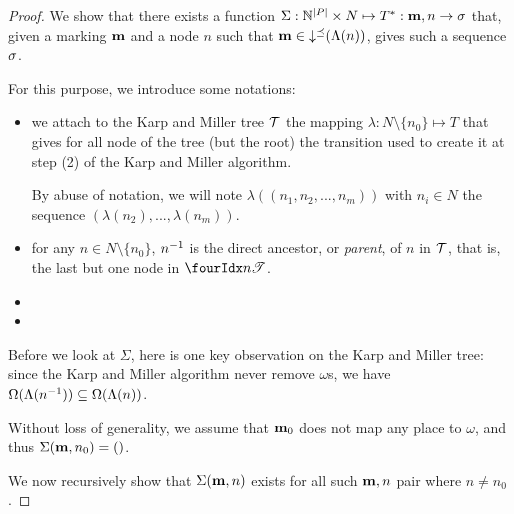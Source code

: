\begin{proof}
  We show that there exists a function $\Sigma : \naturals^{\card{\places}} \times N \mapsto T^* : \mar, n \rightarrow \seqt$ that, given a marking $\mathbf{m}$ and a node $n$ such that $\mathbf{m} \in \operatorname{\downarrow^\preceq}(\operatorname{\Lambda}(n))$, gives such a sequence $\seqt$.

  For this purpose, we introduce some notations:
  \begin{itemize}
    \item we attach to the Karp and Miller tree $\mathcal{T}$ the mapping $\lambda : N \setminus \{n_0\} \mapsto T$ that gives for all node of the tree (but the root) the transition used to create it at step (2) of the Karp and Miller algorithm.

      By abuse of notation, we will note $\lambda((n_1, n_2, ..., n_m))$
      with  $n_i \in N$
      the sequence $(\lambda(n_2), ..., \lambda(n_m))$.
    \item for any $n \in N \setminus \{n_0\}$, $n^{-1}$ is the direct ancestor, or \emph{parent}, of $n$ in $\mathcal{T}$, that is, the last but one node in $\treepath{n}$.
    \item {}
    \item {}
  \end{itemize}

  Before we look at $\Sigma$, here is one key observation on the Karp and Miller tree:
  since the Karp and Miller algorithm never remove $\omega$s, we have
  $\operatorname{\Omega}(\operatorname{\Lambda}(n^{-1})) \subseteq \operatorname{\Omega}(\operatorname{\Lambda}(n))$.

  Without loss of generality, we assume that $\mathbf{m}_0$ does not map any place to $\omega$, and thus $\Sigma(\mathbf{m}, n_0) = ()$.

  We now recursively show that $\Sigma(\mathbf{m}, n)$ exists for all such $\mathbf{m}, n$ pair where $n \neq n_0$.


\end{proof}
